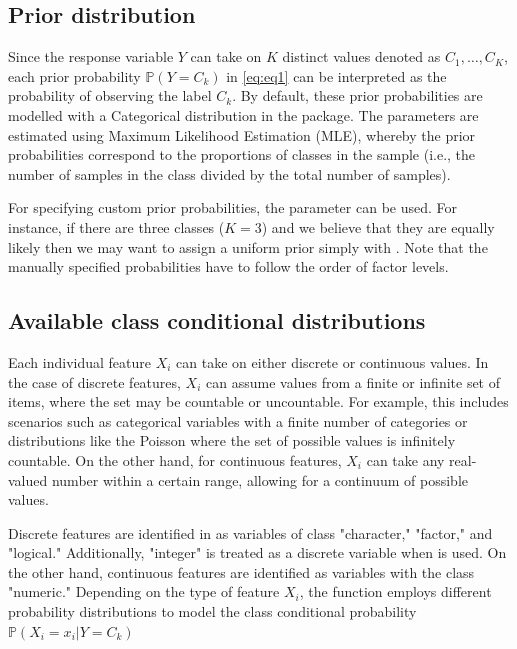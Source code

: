 \documentclass{article}\usepackage[]{graphicx}\usepackage[]{xcolor}
\begin{document}
\label{subsection:prior_distribution}
\subsection{Prior distribution}

Since the response variable $Y$ can take on $K$ distinct values denoted as $C_1,\ldots,C_K$, each prior probability $\mathbb{P}(Y = C_k)$ in \eqref{eq:eq1} can be interpreted as the probability of observing the label $C_k$. By default, these prior probabilities are modelled with a Categorical distribution in the \textcolor{darkgreen}{{}} package. The parameters are estimated using Maximum Likelihood Estimation (MLE), whereby the prior probabilities correspond to the proportions of classes in the sample (i.e., the number of samples in the class divided by the total number of samples).

For specifying custom prior probabilities, the parameter  \textcolor{darkgreen}{{}} can be used. For instance, if there are three classes ($K=3$) and we believe that they are equally likely then we may want to assign a uniform prior simply with \textcolor{darkgreen}{{}}. Note that the manually specified probabilities have to follow the order of factor levels.

\subsection{Available class conditional distributions}

Each individual feature $X_i$ can take on either discrete or continuous values. In the case of discrete features, $X_i$ can assume values from a finite or infinite set of items, where the set may be countable or uncountable. For example, this includes scenarios such as categorical variables with a finite number of categories or distributions like the Poisson where the set of possible values is infinitely countable. On the other hand, for continuous features, $X_i$ can take any real-valued number within a certain range, allowing for a continuum of possible values.

Discrete features are identified in \textcolor{darkgreen}{{}} as variables of class "character," "factor," and "logical." Additionally, "integer" is treated as a discrete variable when \textcolor{darkgreen}{{}} is used. On the other hand, continuous features are identified as variables with the class "numeric." Depending on the type of feature $X_i$, the \textcolor{darkgreen}{{}} function employs different probability distributions to model the class conditional probability $\mathbb{P}(X_i = x_i | Y = C_k)$
\end{document}
